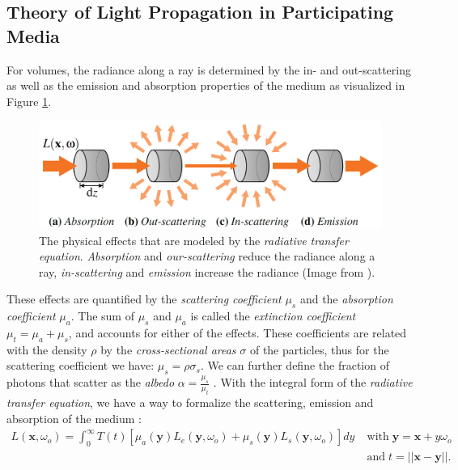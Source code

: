 \subsection{Theory of Light Propagation in Participating Media}
\label{subsec:theory_of_light_propagation_in_participating_media}
For volumes, the radiance along a ray is determined by the in- and out-scattering as well as the emission and absorption properties of the medium as visualized in Figure \ref{fig:novak_volume_effects}.
\begin{figure}[t]
    \centering
    \includegraphics[width=0.7\linewidth]{img/novak_volume_effects.png}
    \caption[Physical effects in a volume]{The physical effects that are modeled by the \textit{radiative transfer equation}. \textit{Absorption} and \textit{our-scattering} reduce the radiance along a ray, \textit{in-scattering} and \textit{emission} increase the radiance (Image from \cite{novak_overview}).}
    \label{fig:novak_volume_effects}
\end{figure}
These effects are quantified by the \textit{scattering coefficient} $\mu_s$ and the \textit{absorption coefficient} $\mu_a$.
The sum of $\mu_s$ and $\mu_a$ is called the \textit{extinction coefficient} $\mu_t=\mu_a + \mu_s$, and accounts for either of the effects.
These coefficients are related with the density $\rho$ by the \textit{cross-sectional areas} $\sigma$ of the particles, thus for the scattering coefficient we have: $\mu_s = \rho \sigma_s$.
We can further define the fraction of photons that scatter as the \textit{albedo} $\alpha=\frac{\mu_s}{\mu_t}$ \cite{novak_overview}.
With the integral form of the \textit{radiative transfer equation}, we have a way to formalize the scattering, emission and absorption of the medium \cite{novak_overview}:
\begin{equation}
    \begin{split}
        \label{eq:radiative_transfer}
        L(\boldsymbol{x}, \omega_o) = \int_0^\infty T(t)[\mu_a(\boldsymbol{y})L_e(\boldsymbol{y}, \omega_o) + \mu_s(\boldsymbol{y})L_s(\boldsymbol{y}, \omega_o)]dy & \;\text{with}\; \boldsymbol{y}=\boldsymbol{x} + y\omega_o \\
                                                                                                                                                                    & \;\text{and}\; t=||\boldsymbol{x}-\boldsymbol{y}||.
    \end{split}
\end{equation}
